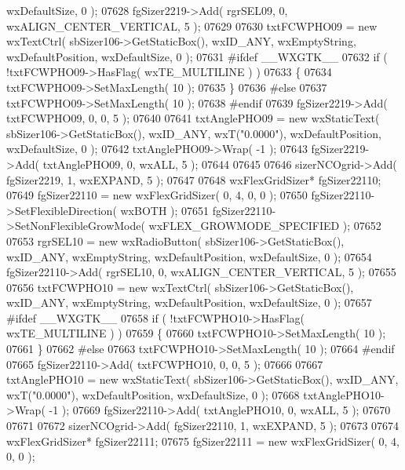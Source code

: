 \begin{DoxyCode}
      wxDefaultSize, 0 );
07628     fgSizer2219->Add( rgrSEL09, 0, wxALIGN\_CENTER\_VERTICAL, 5 );
07629     
07630     txtFCWPHO09 = \textcolor{keyword}{new} wxTextCtrl( sbSizer106->GetStaticBox(), wxID\_ANY, wxEmptyString, wxDefaultPosition, 
      wxDefaultSize, 0 );
07631 \textcolor{preprocessor}{    #ifdef \_\_WXGTK\_\_}
07632     \textcolor{keywordflow}{if} ( !txtFCWPHO09->HasFlag( wxTE\_MULTILINE ) )
07633     \{
07634     txtFCWPHO09->SetMaxLength( 10 );
07635     \}
07636 \textcolor{preprocessor}{    #else}
07637     txtFCWPHO09->SetMaxLength( 10 );
07638 \textcolor{preprocessor}{    #endif}
07639     fgSizer2219->Add( txtFCWPHO09, 0, 0, 5 );
07640     
07641     txtAnglePHO09 = \textcolor{keyword}{new} wxStaticText( sbSizer106->GetStaticBox(), wxID\_ANY, wxT(\textcolor{stringliteral}{"0.0000"}), 
      wxDefaultPosition, wxDefaultSize, 0 );
07642     txtAnglePHO09->Wrap( -1 );
07643     fgSizer2219->Add( txtAnglePHO09, 0, wxALL, 5 );
07644     
07645     
07646     sizerNCOgrid->Add( fgSizer2219, 1, wxEXPAND, 5 );
07647     
07648     wxFlexGridSizer* fgSizer22110;
07649     fgSizer22110 = \textcolor{keyword}{new} wxFlexGridSizer( 0, 4, 0, 0 );
07650     fgSizer22110->SetFlexibleDirection( wxBOTH );
07651     fgSizer22110->SetNonFlexibleGrowMode( wxFLEX\_GROWMODE\_SPECIFIED );
07652     
07653     rgrSEL10 = \textcolor{keyword}{new} wxRadioButton( sbSizer106->GetStaticBox(), wxID\_ANY, wxEmptyString, wxDefaultPosition, 
      wxDefaultSize, 0 );
07654     fgSizer22110->Add( rgrSEL10, 0, wxALIGN\_CENTER\_VERTICAL, 5 );
07655     
07656     txtFCWPHO10 = \textcolor{keyword}{new} wxTextCtrl( sbSizer106->GetStaticBox(), wxID\_ANY, wxEmptyString, wxDefaultPosition, 
      wxDefaultSize, 0 );
07657 \textcolor{preprocessor}{    #ifdef \_\_WXGTK\_\_}
07658     \textcolor{keywordflow}{if} ( !txtFCWPHO10->HasFlag( wxTE\_MULTILINE ) )
07659     \{
07660     txtFCWPHO10->SetMaxLength( 10 );
07661     \}
07662 \textcolor{preprocessor}{    #else}
07663     txtFCWPHO10->SetMaxLength( 10 );
07664 \textcolor{preprocessor}{    #endif}
07665     fgSizer22110->Add( txtFCWPHO10, 0, 0, 5 );
07666     
07667     txtAnglePHO10 = \textcolor{keyword}{new} wxStaticText( sbSizer106->GetStaticBox(), wxID\_ANY, wxT(\textcolor{stringliteral}{"0.0000"}), 
      wxDefaultPosition, wxDefaultSize, 0 );
07668     txtAnglePHO10->Wrap( -1 );
07669     fgSizer22110->Add( txtAnglePHO10, 0, wxALL, 5 );
07670     
07671     
07672     sizerNCOgrid->Add( fgSizer22110, 1, wxEXPAND, 5 );
07673     
07674     wxFlexGridSizer* fgSizer22111;
07675     fgSizer22111 = \textcolor{keyword}{new} wxFlexGridSizer( 0, 4, 0, 0 );

\end{DoxyCode}
